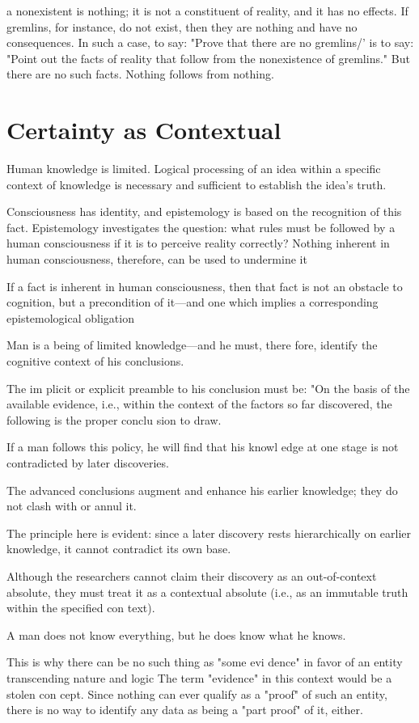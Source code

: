         a nonexistent is nothing; it is not a constituent of reality, and it has no effects. If gremlins, for instance, do not exist, then they are nothing and have no consequences. In such a case, to say: "Prove that there are no gremlins/' is to say: "Point out the facts of reality that follow from the nonexistence of gremlins." But there are no such facts. Nothing follows from nothing.

    \section{Certainty as Contextual}
    
        Human knowledge is limited. Logical processing of an idea within a specific context of knowledge is necessary and sufficient to establish the idea's truth.
        
        Consciousness has identity, and epistemology is based on the recognition of this fact. Epistemology investigates the question: what rules must be followed by a human consciousness if it is to perceive reality correctly? Nothing inherent in human consciousness, therefore, can be used to undermine it

        If a fact is inherent in human consciousness, then that fact is not an obstacle to cognition, but a precondition of it—and one which implies a corresponding epistemological obligation

        Man is a being of limited knowledge—and he must, there fore, identify the cognitive context of his conclusions.

        The im plicit or explicit preamble to his conclusion must be: "On the basis of the available evidence, i.e., within the context of the factors so far discovered, the following is the proper conclu sion to draw.

        If a man follows this policy, he will find that his knowl edge at one stage is not contradicted by later discoveries.

        The advanced conclusions augment and enhance his earlier knowledge; they do not clash with or annul it.

        The principle here is evident: since a later discovery rests hierarchically on earlier knowledge, it cannot contradict its own base.
        
        Although the researchers cannot claim their discovery as an out-of-context absolute, they must treat it as a contextual absolute (i.e., as an immutable truth within the specified con text).

        A man does not know everything, but he does know what he knows.
        
        This is why there can be no such thing as "some evi dence" in favor of an entity transcending nature and logic The term "evidence" in this context would be a stolen con cept. Since nothing can ever qualify as a "proof" of such an entity, there is no way to identify any data as being a "part proof" of it, either.